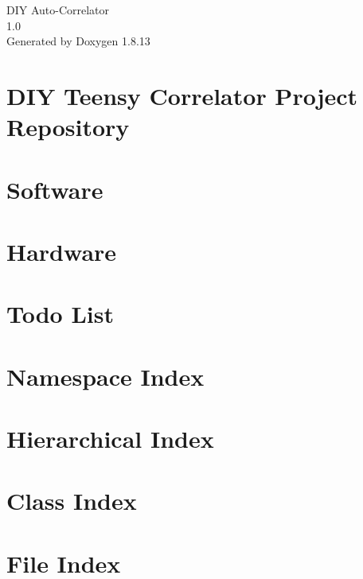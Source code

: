 \documentclass[twoside]{book}
\newcommand{\+}{\discretionary{\mbox{\scriptsize$\hookleftarrow$}}{}{}}
\newcommand{\clearemptydoublepage}{%
  \newpage{\pagestyle{empty}\cleardoublepage}%
}
\begin{document}
\hypersetup{pageanchor=false,
             bookmarksnumbered=true,
             pdfencoding=unicode
            }
\begin{titlepage}
\vspace*{7cm}
\begin{center}%
{\Large D\+IY Auto-\/\+Correlator \\[1ex]\large 1.\+0 }\\
\vspace*{1cm}
{\large Generated by Doxygen 1.8.13}\\
\end{center}
\end{titlepage}
\clearemptydoublepage
{}
\tableofcontents
\clearemptydoublepage
{}
\hypersetup{pageanchor=true}

\chapter{D\+IY Teensy Correlator Project Repository}
\label{index}\hypertarget{index}{}
\chapter{Software}
\label{md_code_software_README}

\chapter{Hardware}
\label{md_code_hardware_README}

\chapter{Todo List}
\label{todo}

\chapter{Namespace Index}

\chapter{Hierarchical Index}

\chapter{Class Index}

\chapter{File Index}

\end{document}
